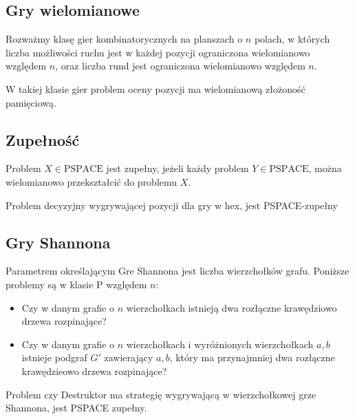 \documentclass{../notatki}
\begin{document}
\subsection{Gry wielomianowe}

Rozważmy klasę gier kombinatorycznych na planszach o $n$ polach, w których
liczba możliwości ruchu jest w każdej pozycji ograniczona wielomianowo względem
$n$, oraz liczba rund jest ograniczona wielomianowo względem $n$.

W takiej klasie gier problem oceny pozycji ma wielomianową złożoność pamięciową.

\subsection{Zupełność}

Problem $X \in \textrm{PSPACE}$ jest zupełny, jeżeli każdy problem $Y
\in \textrm{PSPACE}$, można wielomianowo przekształcić do problemu $X$.

\begin{examplebox}
  Problem decyzyjny wygrywającej pozycji dla gry w hex, jest PSPACE-zupełny
\end{examplebox}

\subsection{Gry Shannona}

Parametrem określającym Gre Shannona jest liczba wierzchołków grafu.
Poniższe problemy są w klasie P względem $n$:
\begin{itemize}
  \item Czy w danym grafie o $n$ wierzchołkach istnieją dwa rozłączne
    krawędziowo drzewa rozpinające?
  \item Czy w danym grafie o $n$ wierzchołkach i wyróżnionych wierzchołkach
    $a, b$ istnieje podgraf $G'$ zawierający $a, b$, który ma
    przynajmniej dwa rozłączne krawędzieowo drzewa rozpinające?
\end{itemize}

Problem czy Destruktor ma strategię wygrywającą w wierzchołkowej grze Shannona,
jest PSPACE zupełny.
\end{document}
